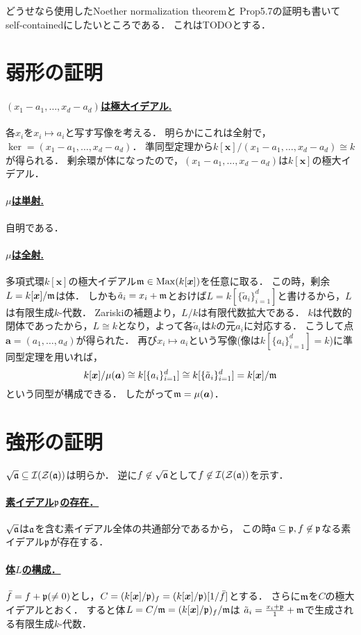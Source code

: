 \documentclass[lualatex, ja=standard, a4paper]{bxjsarticle}
\newcommand{\step}[1]{\paragraph{\underline{#1}}}
\newcommand{\xz}{\boldsymbol{x}}
\newcommand{\az}{\boldsymbol{a}}
\begin{document}
    どうせなら使用したNoether normalization theoremと
    \cite{atimac} Prop5.7の証明も書いてself-containedにしたいところである．
    これはTODOとする．

\section{弱形の証明}
    \step{$(x_1-a_1, \dots, x_d-a_d)$は極大イデアル.}
    各$x_i$を$x_i \mapsto a_i$と写す写像を考える．
    明らかにこれは全射で，$\ker = (x_1-a_1, \dots, x_d-a_d)$．
    準同型定理から$k[\xz]/(x_1-a_1, \dots, x_d-a_d) \cong k$が得られる．
    剰余環が体になったので，$(x_1-a_1, \dots, x_d-a_d)$は$k[\xz]$の極大イデアル．

    \step{$\mu$は単射.}
    自明である．

    \step{$\mu$は全射.}
    多項式環$k[\xz]$の極大イデアル$\I{m} \in \Max(k[\xz])$を任意に取る．
    この時，剰余$L=k[\xz]/\I{m}$は体．
    しかも$\tilde{a}_i=x_i+\mathfrak{m}$とおけば$L=k[\{\tilde{a}_i\}_{i=1}^d]$と書けるから，$L$は有限生成$k$-代数．
    Zariskiの補題より，$L/k$は有限代数拡大である．
    $k$は代数的閉体であったから，$L \cong k$となり，よって各$\tilde{a}_i$は$k$の元$a_i$に対応する．
    こうして点$\az=(a_1,\dots,a_d)$が得られた．
    再び$x_i \mapsto a_i$という写像(像は$k[\{a_i\}_{i=1}^d]=k$)に準同型定理を用いれば，
    \[ k[\xz]/\mu(\az) \cong k[\{a_i\}_{i=1}^d] \cong k[\{\tilde{a}_i\}_{i=1}^d]=k[\xz]/\I{m} \]
    という同型が構成できる．
    したがって$\I{m}=\mu(\az)$．

\section{強形の証明}
    $\sqrt{\mathfrak{a}} \subseteq \mathcal{I}(\mathcal{Z}(\mathfrak{a}))$は明らか．
    逆に$f \not \in \sqrt{\mathfrak{a}}$として$f \not \in \mathcal{I}(\mathcal{Z}(\mathfrak{a}))$を示す．

    \step{素イデアル$\mathfrak{p}$の存在．}
    $\sqrt{\mathfrak{a}}$は$\mathfrak{a}$を含む素イデアル全体の共通部分であるから，
    この時$\mathfrak{a} \subseteq \mathfrak{p}, f \not \in \mathfrak{p}$なる素イデアル$\mathfrak{p}$が存在する．

    \step{体$L$の構成．}
    $\bar{f}=f+\mathfrak{p} (\neq 0)$とし，$C=(k[\xz]/\I{p})_f=(k[\xz]/\I{p})[1/\bar{f}]$とする．
    さらに$\mathfrak{m}$を$C$の極大イデアルとおく．
    すると体$L=C/\I{m}=(k[\xz]/\I{p})_f/\I{m}$は
    $\tilde{a}_i=\frac{x_i+\mathfrak{p}}{1}+\mathfrak{m}$で生成される有限生成$k$-代数．
\end{document}
